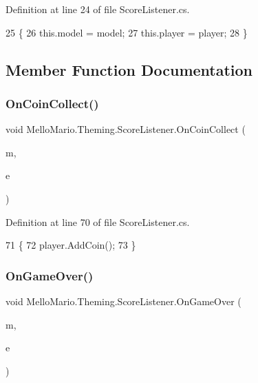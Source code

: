 Definition at line 24 of file Score\+Listener.\+cs.


\begin{DoxyCode}
25         \{
26             this.model = model;
27             this.player = player;
28         \}
\end{DoxyCode}


\subsection{Member Function Documentation}
\mbox{\label{classMelloMario_1_1Theming_1_1ScoreListener_a95a17599de5a7dffdbae3aca57033484}} 
\subsubsection{On\+Coin\+Collect()}
{\footnotesize\ttfamily void Mello\+Mario.\+Theming.\+Score\+Listener.\+On\+Coin\+Collect (\begin{DoxyParamCaption}\item[{\textbf{ Coin}}]{m,  }\item[{Event\+Args}]{e }\end{DoxyParamCaption})\hspace{0.3cm}{\ttfamily [private]}}



Definition at line 70 of file Score\+Listener.\+cs.


\begin{DoxyCode}
71         \{
72             player.AddCoin();
73         \}
\end{DoxyCode}
\mbox{\label{classMelloMario_1_1Theming_1_1ScoreListener_ac4810832aabb824b9e0ac1c8c2b791d8}} 
\subsubsection{On\+Game\+Over()}
{\footnotesize\ttfamily void Mello\+Mario.\+Theming.\+Score\+Listener.\+On\+Game\+Over (\begin{DoxyParamCaption}\item[{\textbf{ Mario}}]{m,  }\item[{Event\+Args}]{e }\end{DoxyParamCaption})\hspace{0.3cm}{\ttfamily [private]}}



